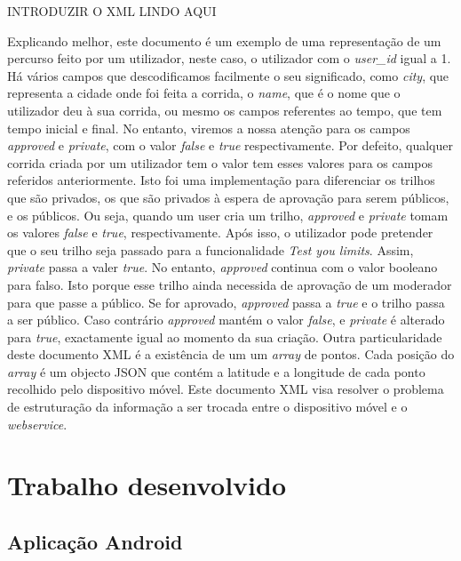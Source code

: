 \documentclass[twocolumn,twoside,10pt,a4paper]{article}
\begin{document}
INTRODUZIR O XML LINDO AQUI

Explicando melhor, este documento é um exemplo de uma representação de um percurso feito por um utilizador, neste caso, o utilizador com o \textit{user\_id} igual a 1. Há vários campos que descodificamos facilmente o seu significado, como \textit{city}, que representa a cidade onde foi feita a corrida, o \textit{name}, que é o nome que o utilizador deu à sua corrida, ou mesmo os campos referentes ao tempo, que tem tempo inicial e final. No entanto, viremos a nossa atenção para os campos \textit{approved} e \textit{private}, com o valor \textit{false} e \textit{true} respectivamente. Por defeito, qualquer corrida criada por um utilizador tem o valor tem esses valores para os campos referidos anteriormente. Isto foi uma implementação para diferenciar os trilhos que são privados, os que são privados à espera de aprovação para serem públicos, e os públicos. Ou seja, quando um user cria um trilho, \textit{approved} e \textit{private} tomam os valores \textit{false} e \textit{true}, respectivamente. Após isso, o utilizador pode pretender que o seu trilho seja passado para a funcionalidade \textit{Test you limits}. Assim, \textit{private} passa a valer \textit{true}. No entanto, \textit{approved} continua com o valor booleano para falso. Isto porque esse trilho ainda necessida de aprovação de um moderador para que passe a público. Se for aprovado, \textit{approved} passa a \textit{true} e o trilho passa a ser público. Caso contrário \textit{approved} mantém o valor \textit{false}, e \textit{private} é alterado para \textit{true}, exactamente igual ao momento da sua criação.
Outra particularidade deste documento XML é a existência de um um \textit{array} de pontos. Cada posição do \textit{array} é um objecto JSON que contém a latitude e a longitude de cada ponto recolhido pelo dispositivo móvel.
Este documento XML visa resolver o problema de estruturação da informação a ser trocada entre o dispositivo móvel e o \textit{webservice}. 

\section{Trabalho desenvolvido}\label{sec:trabalhodesenvolvido}

\subsection{Aplicação Android}
\end{document}
